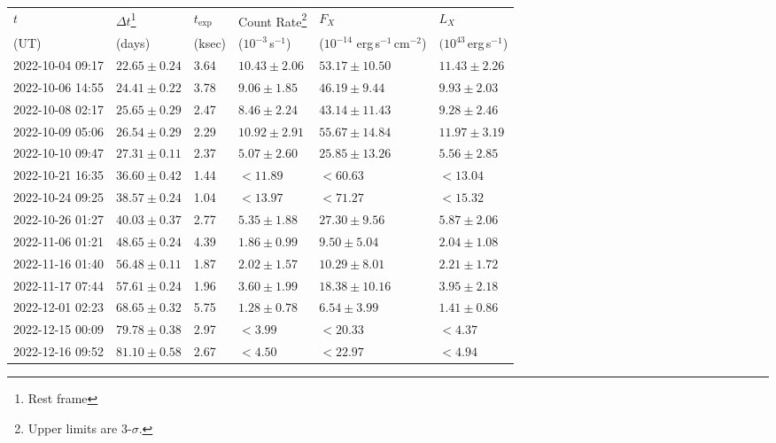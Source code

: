 \documentclass{nature_plusfigure}
\newcommand{\at}{AT2022tsd}
\begin{document}
\begin{supplement}
\clearpage

\begin{table*} 
\centering 
\begin{tabular}{llllll}
\hline\hline
$t$ & $\Delta t$\footnote{Rest frame} & $t_\mathrm{exp}$ & Count Rate\footnote{Upper limits are 3-$\sigma$.} & $F_X$ & $L_X$ \\ 
(UT) & (days) & (ksec) & ($10^{-3}$\,s$^{-1}$) & ($10^{-14}$ erg\,s$^{-1}$\,cm$^{-2}$) & $(10^{43}$\,erg\,s$^{-1}$) \\ 
\hline
2022-10-04 09:17 & $22.65\pm0.24$ & 3.64 & $10.43\pm2.06$ & $53.17\pm10.50$ & $11.43\pm2.26$  \\ 
2022-10-06 14:55 & $24.41\pm0.22$ & 3.78 & $9.06\pm1.85$ & $46.19\pm9.44$ & $9.93\pm2.03$  \\ 
2022-10-08 02:17 & $25.65\pm0.29$ & 2.47 & $8.46\pm2.24$ & $43.14\pm11.43$ & $9.28\pm2.46$  \\ 
2022-10-09 05:06 & $26.54\pm0.29$ & 2.29 & $10.92\pm2.91$ & $55.67\pm14.84$ & $11.97\pm3.19$  \\ 
2022-10-10 09:47 & $27.31\pm0.11$ & 2.37 & $5.07\pm2.60$ & $25.85\pm13.26$ & $5.56\pm2.85$  \\ 
2022-10-21 16:35 & $36.60\pm0.42$ & 1.44 & $<11.89$ & $<60.63$ & $<13.04$  \\ 
2022-10-24 09:25 & $38.57\pm0.24$ & 1.04 & $<13.97$ & $<71.27$ & $<15.32$  \\ 
2022-10-26 01:27 & $40.03\pm0.37$ & 2.77 & $5.35\pm1.88$ & $27.30\pm9.56$ & $5.87\pm2.06$  \\ 
2022-11-06 01:21 & $48.65\pm0.24$ & 4.39 & $1.86\pm0.99$ & $9.50\pm5.04$ & $2.04\pm1.08$  \\ 
2022-11-16 01:40 & $56.48\pm0.11$ & 1.87 & $2.02\pm1.57$ & $10.29\pm8.01$ & $2.21\pm1.72$  \\ 
2022-11-17 07:44 & $57.61\pm0.24$ & 1.96 & $3.60\pm1.99$ & $18.38\pm10.16$ & $3.95\pm2.18$  \\ 
2022-12-01 02:23 & $68.65\pm0.32$ & 5.75 & $1.28\pm0.78$ & $6.54\pm3.99$ & $1.41\pm0.86$  \\ 
2022-12-15 00:09 & $79.78\pm0.38$ & 2.97 & $<3.99$ & $<20.33$ & $<4.37$  \\ 
2022-12-16 09:52 & $81.10\pm0.58$ & 2.67 & $<4.50$ & $<22.97$ & $<4.94$  \\ 
\hline 
\end{tabular} 
\caption{Swift XRT observations of \at.} 
\label{tab:xray-observations} 
\end{table*} 


\end{supplement}
\end{document}
